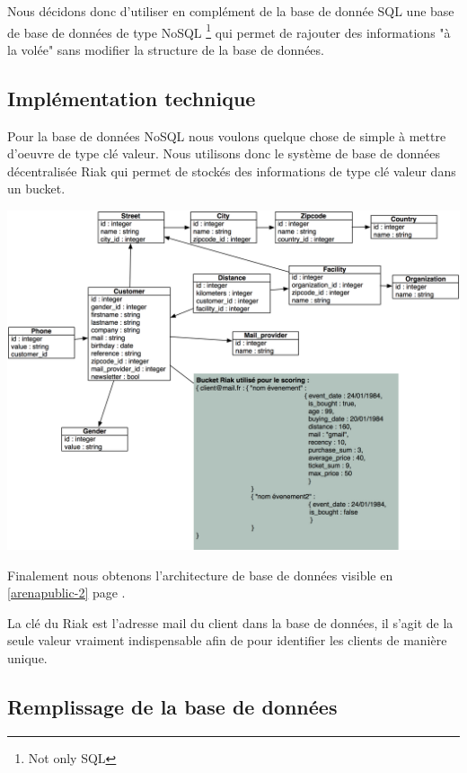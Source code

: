 Nous décidons donc d'utiliser en complément de la base de donnée SQL une base de base de données de type NoSQL \footnote{Not only SQL} qui permet de rajouter des informations "à la volée" sans modifier la structure de la base de données. 

\subsection{Implémentation technique}
Pour la base de données NoSQL nous voulons quelque chose de simple à mettre d’oeuvre de type clé valeur. Nous utilisons donc le système de base de données décentralisée Riak qui permet de stockés des informations de type clé valeur dans un bucket.

\begin{center}
\includegraphics[scale=0.62]{images/arenapublic-2.png}
\label{arenapublic-2}
\end{center}

Finalement nous obtenons l'architecture de base de données visible en \ref{arenapublic-2} page \pageref{arenapublic-2}.

La clé du Riak est l'adresse mail du client dans la base de données, il s'agit de la seule valeur vraiment indispensable afin de pour identifier les clients de manière unique.

\subsection{Remplissage de la base de données}

